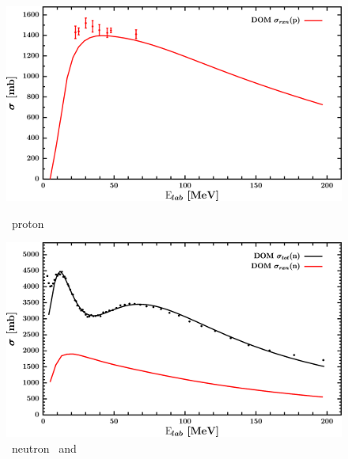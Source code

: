 \vspace{0.70in}
\begin{figure}[hbtp]
    \centering
    \begin{minipage}{0.47\textwidth}
        \centering
        \includegraphics[width=\linewidth]{figures/sn112_protonInelastic.png}
        \caption*{\snTwelve\ proton \rxn}
        \label{DOMFitData_sn112_proton_inelastic}
    \end{minipage}\hspace{6pt}
    \begin{minipage}{0.47\textwidth}
        \centering
        \includegraphics[width=\textwidth]{figures/sn112_neutronInelastic.png}
        \caption*{\snTwelve\ neutron \rxn\ and \tot}
        \label{DOMFitData_sn112_neutron_inelastic}
    \end{minipage}
\end{figure}
\afterpage{\clearpage}
